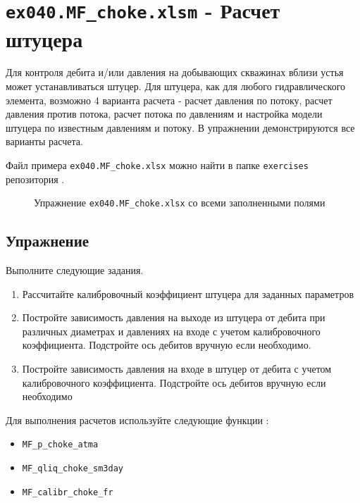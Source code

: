 \section{\texttt{ex040.MF\_choke.xlsm} - Расчет штуцера}

Для контроля дебита и/или давления на добывающих скважинах вблизи устья может устанавливаться штуцер. Для штуцера, как для любого гидравлического элемента, возможно 4 варианта расчета - расчет давления по потоку, расчет давления против потока, расчет потока по давлениям и настройка модели штуцера по известным давлениям и потоку. В упражнении демонстрируются все варианты расчета. 

Файл примера \texttt{ex040.MF_choke.xlsx} можно найти в папке \texttt{exercises} репозитория \unf{}.

\begin{figure}[h!]
	\center{\texttt{[image: Ex40\_1]}}
	\caption{Упражнение \texttt{ex040.MF_choke.xlsx} со всеми заполненными полями }
	\label{ris:Ex40_1}
\end{figure}


\subsection{Упражнение}
Выполните следующие задания.
\begin{enumerate}
	\item Рассчитайте калибровочный коэффициент штуцера для заданных параметров
	\item Постройте зависимость давления на выходе из штуцера от дебита при различных диаметрах и давлениях на входе с учетом калибровочного коэффициента. Подстройте ось дебитов вручную если необходимо.
	\item Постройте зависимость давления на входе в штуцер от дебита  с учетом калибровочного коэффициента. Подстройте ось дебитов вручную если необходимо 
\end{enumerate}

Для выполнения расчетов используйте следующие функции \unf{}:
\begin{itemize}
	
	\item \texttt{MF_p_choke_atma}
	\item \texttt{MF_qliq_choke_sm3day}
	\item \texttt{MF_calibr_choke_fr}
	
\end{itemize}


